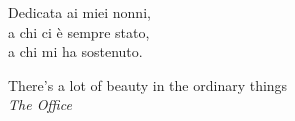 \cleardoublepage
    \thispagestyle{empty}
            \begin{flushright}
				Dedicata ai miei nonni,\\
				a chi ci è sempre stato,\\
				a chi mi ha sostenuto.
				\\
				\vspace{2em}

				There's a lot of beauty in the ordinary things\\
				\textit{The Office}

            \end{flushright}
\cleardoublepage